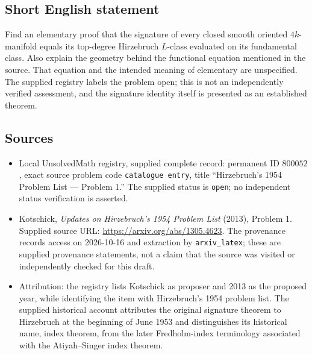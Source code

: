 \documentclass[11pt]{article}
\begin{document}
\subsection{Short English statement}
Find an elementary proof that the signature of every closed smooth oriented \(4k\)-manifold equals its top-degree Hirzebruch \(L\)-class evaluated on its fundamental class. Also explain the geometry behind the functional equation mentioned in the source. That equation and the intended meaning of elementary are unspecified. The supplied registry labels the problem open; this is not an independently verified assessment, and the signature identity itself is presented as an established theorem.
\subsection{Sources}
\begin{itemize}
\item Local UnsolvedMath registry, supplied complete record: permanent ID \(800052\), exact source problem code \texttt{catalogue entry}, title ``Hirzebruch's 1954 Problem List --- Problem 1.'' The supplied status is \texttt{open}; no independent status verification is asserted.
\item Kotschick, \emph{Updates on Hirzebruch's 1954 Problem List} (2013), Problem 1. Supplied source URL: \url{https://arxiv.org/abs/1305.4623}. The provenance records access on 2026-10-16 and extraction by \texttt{arxiv\_latex}; these are supplied provenance statements, not a claim that the source was visited or independently checked for this draft.
\item Attribution: the registry lists Kotschick as proposer and 2013 as the proposed year, while identifying the item with Hirzebruch's 1954 problem list. The supplied historical account attributes the original signature theorem to Hirzebruch at the beginning of June 1953 and distinguishes its historical name, index theorem, from the later Fredholm-index terminology associated with the Atiyah--Singer index theorem.
\end{itemize}
\end{document}
